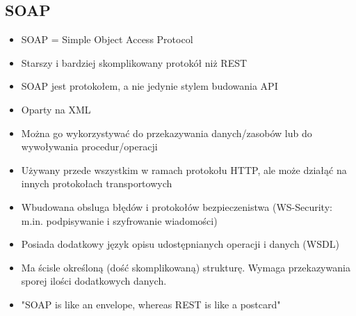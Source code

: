 \documentclass[../main.tex]{subfiles}
\begin{document}
    \subsection{SOAP}
    \begin{itemize}
        \item SOAP = Simple Object Access Protocol
        \item Starszy i bardziej skomplikowany protokół niż REST
        \item SOAP jest protokołem, a nie jedynie stylem budowania API
        \item Oparty na XML
        \item Można go wykorzystywać do przekazywania danych/zasobów lub do
        wywoływania procedur/operacji
        \item Używany przede wszystkim w ramach protokołu HTTP, ale może działąć na innych protokołach transportowych
        \item Wbudowana obsluga błędów i protokołów bezpieczenistwa (WS-Security:
        m.in. podpisywanie i szyfrowanie wiadomości)
        \item Posiada dodatkowy język opisu udostępnianych operacji i danych (WSDL)
        \item Ma ścisle określoną (dość skomplikowaną) strukturę. Wymaga przekazywania
        sporej ilości dodatkowych danych.
        \item "SOAP is like an envelope, whereas REST is like a postcard"
    \end{itemize}
\end{document}
